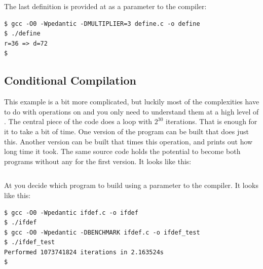 \inputminted{c}{../src/c/generics/define.c}

The last definition is provided at  as a parameter to the compiler:

\begin{verbatim}
$ gcc -O0 -Wpedantic -DMULTIPLIER=3 define.c -o define
$ ./define
r=36 => d=72
$ 
\end{verbatim}

\subsection{Conditional Compilation}

This example is a bit more complicated, but luckily most of the complexities have to do with operations on  and you only need to understand them at a high level of . The central piece of the code does a loop with $2^{30}$ iterations. That is enough for it to take a bit of time. One version of the program can be built that does just this. Another version can be built that times this operation, and prints out how long time it took. The same source code holds the potential to become both programs without any  for the first version. It looks like this:

\inputminted{c}{../src/c/generics/ifdef.c}

At  you decide which program to build using a parameter to the compiler. It looks like this:

\begin{verbatim}
$ gcc -O0 -Wpedantic ifdef.c -o ifdef
$ ./ifdef
$ gcc -O0 -Wpedantic -DBENCHMARK ifdef.c -o ifdef_test
$ ./ifdef_test
Performed 1073741824 iterations in 2.163524s
$ 
\end{verbatim}


